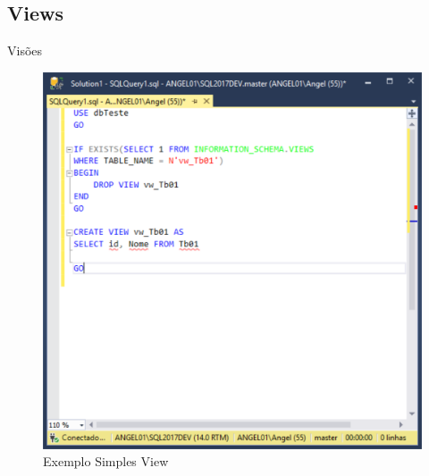 	
	\subsection{Views}

	\begin{frame}
	
\begin{CaixaModelo01}{Visões}
		

	
	\begin{figure}
		\includegraphics[scale=.35]{./Figuras/View01.png}
		\caption{Exemplo Simples View}
		\label{fig:View01}
	\end{figure}



\end{CaixaModelo01}
	
	\end{frame}